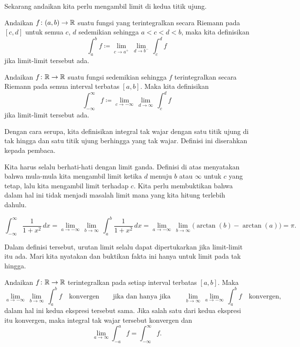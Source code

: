 Sekarang andaikan kita perlu mengambil limit di kedua titik ujung.

\begin{defn}
Andaikan $f \colon (a,b) \to {\mathbb{R}}$ suatu fungsi
yang terintegralkan secara Riemann pada $[c,d]$ untuk semua $c$, $d$
sedemikian sehingga $a < c < d < b$, maka kita definisikan
\begin{equation*}
\int_a^b f \coloneqq \lim_{c \to a^+} \, \lim_{d \to b^-} \, \int_{c}^{d} f
\end{equation*}
jika limit-limit tersebut ada.

Andaikan $f \colon {\mathbb{R}} \to {\mathbb{R}}$ suatu fungsi sedemikian sehingga
$f$ terintegralkan secara Riemann pada semua interval terbatas $[a,b]$.  Maka
kita definisikan
\begin{equation*}
\int_{-\infty}^\infty f \coloneqq \lim_{c \to -\infty} \, \lim_{d \to \infty} \, \int_c^d f
\end{equation*}
jika limit-limit tersebut ada.

Dengan cara serupa, kita definisikan integral tak wajar dengan satu titik ujung di tak hingga
dan satu titik ujung berhingga yang tak wajar.  Definisi ini diserahkan kepada pembaca.
\end{defn}

Kita harus selalu berhati-hati dengan limit ganda.  Definisi
di atas menyatakan bahwa mula-mula kita mengambil limit ketika $d$ menuju $b$ atau
$\infty$ untuk $c$ yang tetap, lalu kita mengambil limit terhadap $c$.
Kita perlu membuktikan bahwa dalam hal ini tidak menjadi masalah limit mana yang
kita hitung terlebih dahulu.

\begin{example}
\begin{equation*}
\int_{-\infty}^\infty \frac{1}{1+x^2} \, dx
=
\lim_{a \to -\infty} \, \lim_{b \to \infty} \,
\int_{a}^b \frac{1}{1+x^2} \, dx
=
\lim_{a \to -\infty} \, \lim_{b \to \infty}
\bigl( \arctan(b) - \arctan(a) \bigr)
=
\pi .
\end{equation*}
\end{example}

Dalam definisi tersebut, urutan limit selalu dapat dipertukarkan jika limit-limit itu
ada.  Mari kita nyatakan dan buktikan fakta ini hanya untuk limit pada tak hingga.

\begin{prop}
Andaikan $f \colon {\mathbb{R}} \to {\mathbb{R}}$ terintegralkan pada setiap interval terbatas
$[a,b]$.
Maka 
\begin{equation*}
\lim_{a \to -\infty} \, \lim_{b \to \infty} \, \int_a^b f
\quad \text{konvergen} \qquad \text{jika dan hanya jika} \qquad
\lim_{b \to \infty}
\,
\lim_{a \to -\infty}
\,
\int_a^b f
\quad
\text{konvergen,}
\end{equation*}
dalam hal ini kedua
ekspresi tersebut sama.  Jika salah satu dari kedua
ekspresi itu konvergen, maka integral tak wajar tersebut konvergen dan
\begin{equation*}
\lim_{a\to\infty}
\int_{-a}^a f
=
\int_{-\infty}^\infty f .
\end{equation*}
\end{prop}

